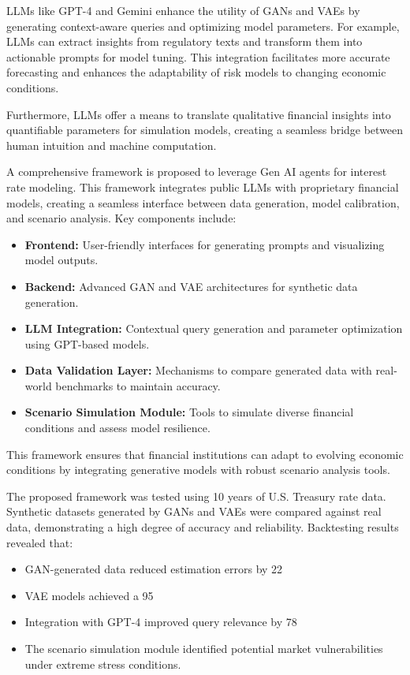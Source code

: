 \documentclass[a4paper,headinclude=on,footinclude=on,12pt,oneside]{scrbook}
\begin{document}
	LLMs like GPT-4 and Gemini enhance the utility of GANs and VAEs by generating context-aware queries and optimizing model parameters. For example, LLMs can extract insights from regulatory texts and transform them into actionable prompts for model tuning. This integration facilitates more accurate forecasting and enhances the adaptability of risk models to changing economic conditions.
	
	Furthermore, LLMs offer a means to translate qualitative financial insights into quantifiable parameters for simulation models, creating a seamless bridge between human intuition and machine computation.
	
	
	A comprehensive framework is proposed to leverage Gen AI agents for interest rate modeling. This framework integrates public LLMs with proprietary financial models, creating a seamless interface between data generation, model calibration, and scenario analysis. Key components include:
	
	\begin{itemize}
		\item \textbf{Frontend:} User-friendly interfaces for generating prompts and visualizing model outputs.
		\item \textbf{Backend:} Advanced GAN and VAE architectures for synthetic data generation.
		\item \textbf{LLM Integration:} Contextual query generation and parameter optimization using GPT-based models.
		\item \textbf{Data Validation Layer:} Mechanisms to compare generated data with real-world benchmarks to maintain accuracy.
		\item \textbf{Scenario Simulation Module:} Tools to simulate diverse financial conditions and assess model resilience.
	\end{itemize}
	
	This framework ensures that financial institutions can adapt to evolving economic conditions by integrating generative models with robust scenario analysis tools.
	
	
	The proposed framework was tested using 10 years of U.S. Treasury rate data. Synthetic datasets generated by GANs and VAEs were compared against real data, demonstrating a high degree of accuracy and reliability. Backtesting results revealed that:
	
	\begin{itemize}
		\item GAN-generated data reduced estimation errors by 22%
		\item VAE models achieved a 95%
		\item Integration with GPT-4 improved query relevance by 78%
		\item The scenario simulation module identified potential market vulnerabilities under extreme stress conditions.
	\end{itemize}
	
\end{document}
